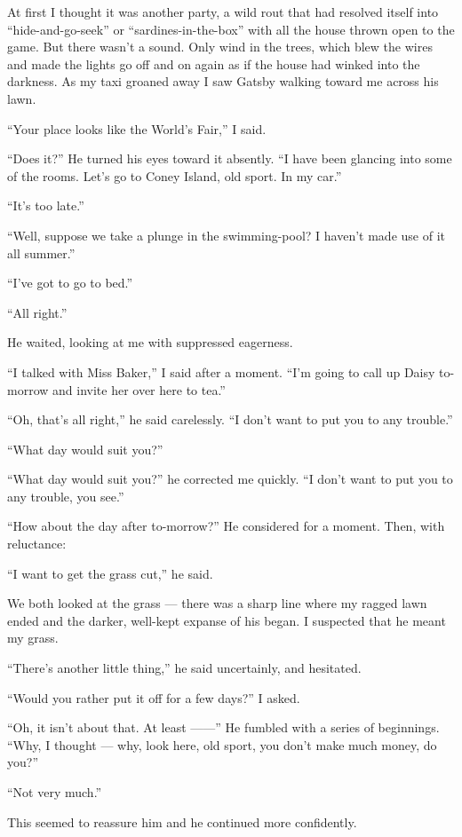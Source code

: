 \documentclass{znotebook}
\begin{document}
At first I thought it was another party, a wild rout that had resolved itself into ``hide-and-go-seek'' or ``sardines-in-the-box'' with all the house thrown open to the game. But there wasn't a sound. Only wind in the trees, which blew the wires and made the lights go off and on again as if the house had winked into the darkness. As my taxi groaned away I saw Gatsby walking toward me across his lawn.

``Your place looks like the World's Fair,'' I said.

``Does it?'' He turned his eyes toward it absently. ``I have been glancing into some of the rooms. Let's go to Coney Island, old sport. In my car.''

``It's too late.''

``Well, suppose we take a plunge in the swimming-pool? I haven't made use of it all summer.''

``I've got to go to bed.''

``All right.''

He waited, looking at me with suppressed eagerness.

``I talked with Miss Baker,'' I said after a moment. ``I'm going to call up Daisy to-morrow and invite her over here to tea.''

``Oh, that's all right,'' he said carelessly. ``I don't want to put you to any trouble.''

``What day would suit you?''

``What day would suit you?'' he corrected me quickly. ``I don't want to put you to any trouble, you see.''

``How about the day after to-morrow?'' He considered for a moment. Then, with reluctance:

``I want to get the grass cut,'' he said.

We both looked at the grass — there was a sharp line where my ragged lawn ended and the darker, well-kept expanse of his began. I suspected that he meant my grass.

``There's another little thing,'' he said uncertainly, and hesitated.

``Would you rather put it off for a few days?'' I asked.

``Oh, it isn't about that. At least ——'' He fumbled with a series of beginnings. ``Why, I thought — why, look here, old sport, you don't make much money, do you?''

``Not very much.''

This seemed to reassure him and he continued more confidently.
\end{document}
